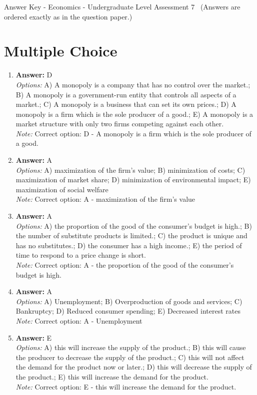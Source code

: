 \documentclass[12pt]{article}
\begin{document}
\begin{center}
Answer Key - Economics - Undergraduate Level Assessment 7 \
\small (Answers are ordered exactly as in the question paper.)
\end{center}

\section*{Multiple Choice}
\begin{enumerate}[label=\arabic*.]
\item \textbf{Answer:} D
\\ \textit{Options:} A) A monopoly is a company that has no control over the market.; B) A monopoly is a government-run entity that controls all aspects of a market.; C) A monopoly is a business that can set its own prices.; D) A monopoly is a firm which is the sole producer of a good.; E) A monopoly is a market structure with only two firms competing against each other.
\\ \textit{Note:} Correct option: D - A monopoly is a firm which is the sole producer of a good.
\item \textbf{Answer:} A
\\ \textit{Options:} A) maximization of the firm's value; B) minimization of costs; C) maximization of market share; D) minimization of environmental impact; E) maximization of social welfare
\\ \textit{Note:} Correct option: A - maximization of the firm's value
\item \textbf{Answer:} A
\\ \textit{Options:} A) the proportion of the good of the consumer's budget is high.; B) the number of substitute products is limited.; C) the product is unique and has no substitutes.; D) the consumer has a high income.; E) the period of time to respond to a price change is short.
\\ \textit{Note:} Correct option: A - the proportion of the good of the consumer's budget is high.
\item \textbf{Answer:} A
\\ \textit{Options:} A) Unemployment; B) Overproduction of goods and services; C) Bankruptcy; D) Reduced consumer spending; E) Decreased interest rates
\\ \textit{Note:} Correct option: A - Unemployment
\item \textbf{Answer:} E
\\ \textit{Options:} A) this will increase the supply of the product.; B) this will cause the producer to decrease the supply of the product.; C) this will not affect the demand for the product now or later.; D) this will decrease the supply of the product.; E) this will increase the demand for the product.
\\ \textit{Note:} Correct option: E - this will increase the demand for the product.
\end{enumerate}
\end{document}

